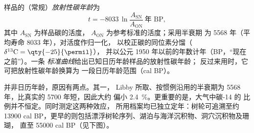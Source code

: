 \begin{definition}\label{def:b1:radiometric-methods:radiocarbon}
样品的（常规）\emph{放射性碳年龄}为
\[
  t = -8033 \,\ln \frac{A_{\mathrm{SN}}}{A_{\mathrm{ON}}} \ \text{年 BP},
\]
其中 $A_{\mathrm{SN}}$ 为样品碳的活度，
$A_{\mathrm{ON}}$ 为参考标准的活度；采用半衰期
为 \num{5568} 年（平均寿命 \num{8033} 年），对活度作归一化，
以校正碳的同位素分馏（$\delta^{13}\mathrm{C} = \qty{-25}{\permil}$），
并以公元 1950 年以前的年数计年（BP，“现在之前”）。一条
\emph{标准曲线}给出已知日历年龄样品的放射性碳年龄；
反过来用时，它可把放射性碳年龄换算为
一段日历年龄范围（cal BP）。
\end{definition}

并非日历年龄，原因有两点。其一，
Libby 所取、按惯例沿用的半衰期为 \num{5568} 年，比真实的 \num{5700} 年短，因此大约
偏小 \qty{2.4}{\percent}。更重要的是，大气中碳-14 的
比例并不恒定。同时测定这两种效应，
所用档案均已独立定年：树轮可追溯至约
\num{13900} cal BP，更早的则包括漂浮树轮序列、湖泊与海洋沉积物、洞穴沉积物及珊瑚，
直至 \num{55000} cal BP（见下图）。

